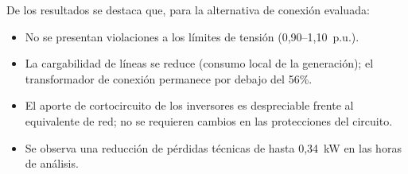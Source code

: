 De los resultados se destaca que, para la alternativa de conexión evaluada:

\begin{itemize}
    \item No se presentan violaciones a los límites de tensión (0,90--1,10~p.u.).
    \item La cargabilidad de líneas se reduce (consumo local de la generación); el transformador de conexión permanece por debajo del 56\%.
    \item El aporte de cortocircuito de los inversores es despreciable frente al equivalente de red; no se requieren cambios en las protecciones del circuito.
    \item Se observa una reducción de pérdidas técnicas de hasta 0,34~kW en las horas de análisis.
\end{itemize}
